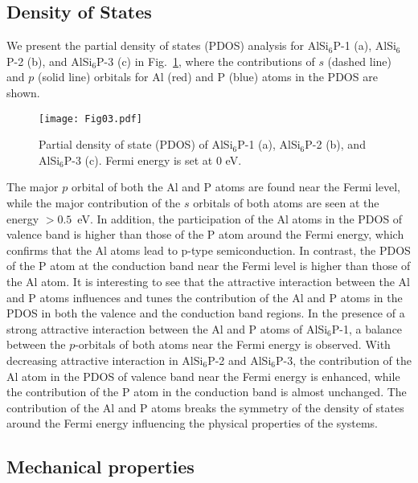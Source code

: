 \documentclass[5p,twocolumn]{elsarticle}
\def\fig#1{Fig.\ \ref{#1}}
\begin{document}
\subsection{Density of States}

We present the partial density of states (PDOS) analysis for AlSi$_6$P-1 (a), AlSi$_6$P-2 (b), and AlSi$_6$P-3 (c) in \fig{fig03}, where the contributions of $s$ (dashed line) and $p$ (solid line) orbitals for Al (red) and P (blue) atoms in the PDOS are shown. 
%
\begin{figure}[htb]
	\centering
	\texttt{[image: Fig03.pdf]}
	\caption{Partial density of state (PDOS) of AlSi$_6$P-1 (a), AlSi$_6$P-2 (b), and AlSi$_6$P-3 (c). Fermi energy is set at 0 eV.}
	\label{fig03}
\end{figure}
%
The major $p$ orbital of both the Al and P atoms are found near the Fermi level, while the major contribution of the $s$ orbitals of both atoms are seen at the energy $>0.5$~eV. In addition, the participation of the Al atoms in the PDOS of valence band is higher than those of the P atom around the Fermi energy, which confirms that the Al atoms lead to p-type semiconduction. In contrast, the PDOS of the P atom at the conduction band near the Fermi level is higher than those of the Al atom. It is interesting to see that the attractive interaction between the Al and P atoms influences and tunes the contribution of the Al and P atoms in the PDOS in both the valence and the conduction band regions. 
%
In the presence of a strong attractive interaction between the Al and P atoms of AlSi$_6$P-1, a balance between the $p$-orbitals of both atoms near the Fermi energy is observed. With decreasing attractive interaction in AlSi$_6$P-2 and AlSi$_6$P-3, the contribution of the Al atom in the PDOS of valence band near the Fermi energy is enhanced, while the contribution of the P atom in the conduction band is almost unchanged. The contribution of the Al and P atoms breaks the symmetry of the density of states around the Fermi energy influencing the physical properties of the systems.


\subsection{Mechanical properties}
\end{document}
